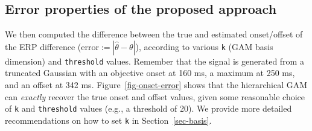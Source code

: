 \documentclass[
  doc,
  floatsintext,
  longtable,
  a4paper,
  nolmodern,
  notxfonts,
  notimes,
  colorlinks=true,linkcolor=blue,citecolor=blue,urlcolor=blue]{apa7}
\newenvironment{Shaded}{\begin{snugshade}}{\end{snugshade}}
\newcommand{\AttributeTok}[1]{\textcolor[rgb]{0.40,0.45,0.13}{#1}}
\newcommand{\CommentTok}[1]{\textcolor[rgb]{0.37,0.37,0.37}{#1}}
\newcommand{\DecValTok}[1]{\textcolor[rgb]{0.68,0.00,0.00}{#1}}
\newcommand{\FloatTok}[1]{\textcolor[rgb]{0.68,0.00,0.00}{#1}}
\newcommand{\FunctionTok}[1]{\textcolor[rgb]{0.28,0.35,0.67}{#1}}
\newcommand{\NormalTok}[1]{\textcolor[rgb]{0.00,0.23,0.31}{#1}}
\newcommand{\OtherTok}[1]{\textcolor[rgb]{0.00,0.23,0.31}{#1}}
\newcommand{\SpecialCharTok}[1]{\textcolor[rgb]{0.37,0.37,0.37}{#1}}
\newcommand{\StringTok}[1]{\textcolor[rgb]{0.13,0.47,0.30}{#1}}
\begin{document}
\begin{Shaded}
\end{Shaded}

\subsection{Error properties of the proposed
approach}\label{error-properties-of-the-proposed-approach}

We then computed the difference between the true and estimated
onset/offset of the ERP difference
(\(\text{error}:=|\hat{\theta}-\theta|\)), according to various
\texttt{k} (GAM basis dimension) and \texttt{threshold} values. Remember
that the signal is generated from a truncated Gaussian with an objective
onset at 160 ms, a maximum at 250 ms, and an offset at 342 ms.
Figure~\ref{fig-onset-error} shows that the hierarchical GAM can
\emph{exactly} recover the true onset and offset values, given some
reasonable choice of \texttt{k} and \texttt{threshold} values (e.g., a
threshold of 20). We provide more detailed recommendations on how to set
\texttt{k} in Section~\ref{sec-basis}.
\end{document}
